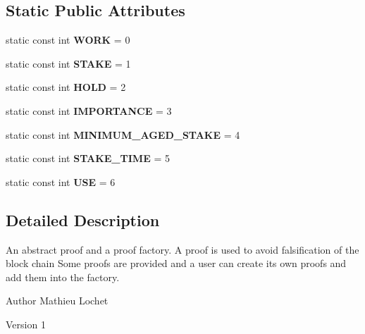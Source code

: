 \subsection*{Static Public Attributes}
\begin{DoxyCompactItemize}
\item 
\mbox{\label{classProof_a457d231986439ee6bcc945daacfc28fc}} 
static const int {\bfseries W\+O\+RK} = 0
\item 
\mbox{\label{classProof_acf157976c3c86ef2fd0e838b8c4ac992}} 
static const int {\bfseries S\+T\+A\+KE} = 1
\item 
\mbox{\label{classProof_ae5c2a86640bf558ff5625157e23b3eec}} 
static const int {\bfseries H\+O\+LD} = 2
\item 
\mbox{\label{classProof_a4e71a5e5928900794353acdd169ca652}} 
static const int {\bfseries I\+M\+P\+O\+R\+T\+A\+N\+CE} = 3
\item 
\mbox{\label{classProof_a1a08ffc465f4fcfde396d4c4feb22eb0}} 
static const int {\bfseries M\+I\+N\+I\+M\+U\+M\+\_\+\+A\+G\+E\+D\+\_\+\+S\+T\+A\+KE} = 4
\item 
\mbox{\label{classProof_a1aa2cb91c5be4ca021714ff6fc01da4a}} 
static const int {\bfseries S\+T\+A\+K\+E\+\_\+\+T\+I\+ME} = 5
\item 
\mbox{\label{classProof_a3f6898fa1d652d32182c3c387c8e979c}} 
static const int {\bfseries U\+SE} = 6
\end{DoxyCompactItemize}


\subsection{Detailed Description}
An abstract proof and a proof factory. A proof is used to avoid falsification of the block chain Some proofs are provided and a user can create its own proofs and add them into the factory.

\begin{DoxyAuthor}{Author}
Mathieu Lochet 
\end{DoxyAuthor}
\begin{DoxyVersion}{Version}
1 
\end{DoxyVersion}


